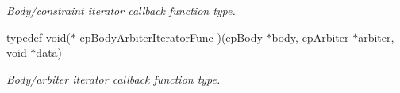 \begin{DoxyCompactItemize}
\begin{DoxyCompactList}\small\item\em Body/constraint iterator callback function type. \end{DoxyCompactList}\item 
\hypertarget{group__cp_body_gacdd17a9f98ca6e6c088b72f7d5f32ea3}{typedef void($\ast$ \hyperlink{group__cp_body_gacdd17a9f98ca6e6c088b72f7d5f32ea3}{cp\-Body\-Arbiter\-Iterator\-Func} )(\hyperlink{structcp_body}{cp\-Body} $\ast$body, \hyperlink{structcp_arbiter}{cp\-Arbiter} $\ast$arbiter, void $\ast$data)}\label{group__cp_body_gacdd17a9f98ca6e6c088b72f7d5f32ea3}

\begin{DoxyCompactList}\small\item\em Body/arbiter iterator callback function type. \end{DoxyCompactList}\end{DoxyCompactItemize}
